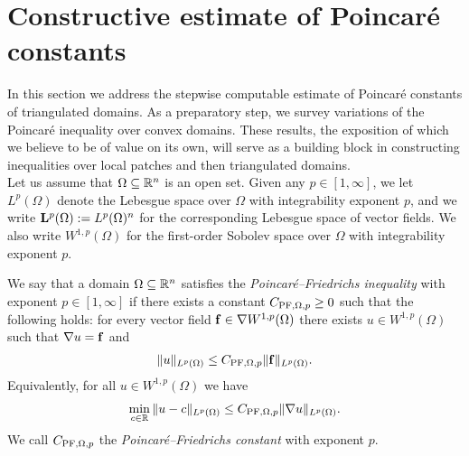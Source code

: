 \documentclass[a4paper]{amsart}
\begin{document}
\section{Constructive estimate of Poincar\'e constants}

In this section we address the stepwise computable estimate of Poincar\'e constants of triangulated domains. As a preparatory step, we survey variations of the Poincar\'e inequality over convex domains. These results, the exposition of which we believe to be of value on its own, will serve as a building block in constructing inequalities over local patches and then triangulated domains.
\\

Let us assume that $\Omega \subseteq {\mathbb R}^{n}$ is an open set. 
Given any $p \in [1,\infty]$, we let $L^p(\Omega)$ denote the Lebesgue space over $\Omega$ with integrability exponent $p$, and we write ${\mathbf L}^p(\Omega) := L^p(\Omega)^n$ for the corresponding Lebesgue space of vector fields. 
We also write $W^{1,p}(\Omega)$ for the first-order Sobolev space over $\Omega$ with integrability exponent $p$. 

We say that a domain $\Omega \subseteq {\mathbb R}^{n}$ satisfies the \emph{Poincar\'e--Friedrichs inequality} with exponent $p \in [1,\infty]$
if there exists a constant $C_{{\rm PF},\Omega,p} \geq 0$ such that the following holds:
for every vector field ${\mathbf f} \in \nabla W^{1,p}(\Omega)$ there exists $u \in W^{1,p}(\Omega)$
such that $\nabla u = {\mathbf f}$ and 
\begin{align}\label{math:inequalitypf:gradient}
    \| u \|_{L^{p}(\Omega)}
    \leq 
    C_{{\rm PF},\Omega,p} 
    \| {\mathbf f} \|_{L^{p}(\Omega)}
    .
\end{align}
Equivalently, for all $u \in W^{1,p}(\Omega)$ we have 
\begin{align}
    \min_{ c \in {\mathbb R} } \| u - c \|_{L^{p}(\Omega)}
    \leq 
    C_{{\rm PF},\Omega,p} 
    \| \nabla u \|_{L^{p}(\Omega)}
    .
\end{align}
We call $C_{{\rm PF},\Omega,p}$ the \emph{Poincar\'e--Friedrichs constant} with exponent $p$. 
\end{document}
